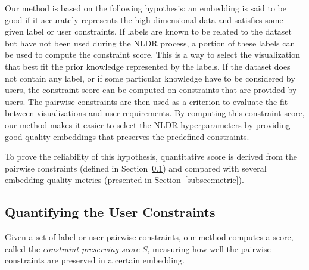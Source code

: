 Our method is based on the following hypothesis: an embedding is said to be good if it accurately represents the high-dimensional data and satisfies some given label or user constraints. If labels are known to be related to the dataset but have not been used during the NLDR process, a portion of these labels can be used to compute the constraint score. This is a way to select the visualization that best fit the prior knowledge represented by the labels. If the dataset does not contain any label, or if some particular knowledge have to be considered by users, the constraint score can be computed on constraints that are provided by users. The pairwise constraints are then used as a criterion to evaluate the fit between visualizations and user requirements.
By computing this constraint score, our method makes it easier to select the NLDR hyperparameters by providing good quality embeddings that preserves the predefined constraints.

To prove the reliability of this hypothesis, quantitative score is derived from the pairwise constraints (defined in Section~\ref{subsec:s_score}) and compared with several embedding quality metrics (presented in Section~\ref{subsec:metric}).

\subsection{Quantifying the User Constraints}\label{subsec:s_score}

Given a set of label or user pairwise constraints, our method computes a score, called the \emph{constraint-preserving score} $S$, measuring how well the pairwise constraints are preserved in a certain embedding.

